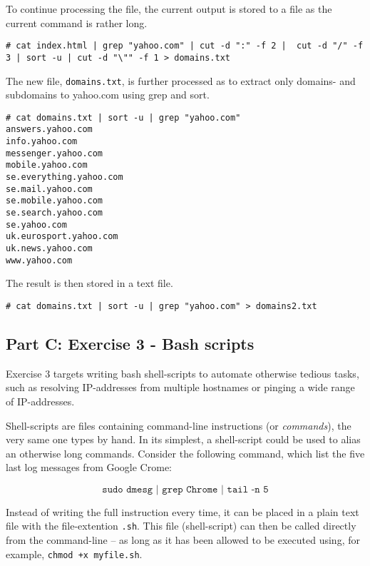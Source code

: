 To continue processing the file, the current output is stored to
a file as the current command is rather long.

\begin{lstlisting}[numbers=none, language={}, frame=single, framexleftmargin={0.2em}]
# cat index.html | grep "yahoo.com" | cut -d ":" -f 2 |  cut -d "/" -f 3 | sort -u | cut -d "\"" -f 1 > domains.txt
\end{lstlisting}

The new file, \texttt{domains.txt}, is further processed as to
extract only domains- and subdomains to yahoo.com using grep
and sort.

\begin{lstlisting}[numbers=none, language={}, frame=single, framexleftmargin={0.2em}]
# cat domains.txt | sort -u | grep "yahoo.com"
answers.yahoo.com
info.yahoo.com
messenger.yahoo.com
mobile.yahoo.com
se.everything.yahoo.com
se.mail.yahoo.com
se.mobile.yahoo.com
se.search.yahoo.com
se.yahoo.com
uk.eurosport.yahoo.com
uk.news.yahoo.com
www.yahoo.com
\end{lstlisting}

The result is then stored in a text file.

\begin{lstlisting}[numbers=none, language={}, frame=single, framexleftmargin={0.2em}]
# cat domains.txt | sort -u | grep "yahoo.com" > domains2.txt
\end{lstlisting}

\pagebreak
\subsection{Part C: Exercise 3 - Bash scripts}
Exercise 3 targets writing bash shell-scripts to automate otherwise tedious
tasks, such as resolving IP-addresses from multiple hostnames or pinging a
wide range of IP-addresses.

Shell-scripts are files containing command-line instructions (or \textit{commands}),
the very same one types by hand. In its simplest, a shell-script could be used to alias an
otherwise long commands. Consider the following command, which list the five last log
messages from Google Crome:

$$\texttt{sudo dmesg | grep Chrome | tail -n 5}$$

Instead of writing the full instruction every time, it can be placed in a plain
text file with the file-extention \texttt{.sh}. This file (shell-script) can
then be called directly from the command-line -- as long as it has been allowed
to be executed using, for example, \texttt{chmod +x myfile.sh}.

